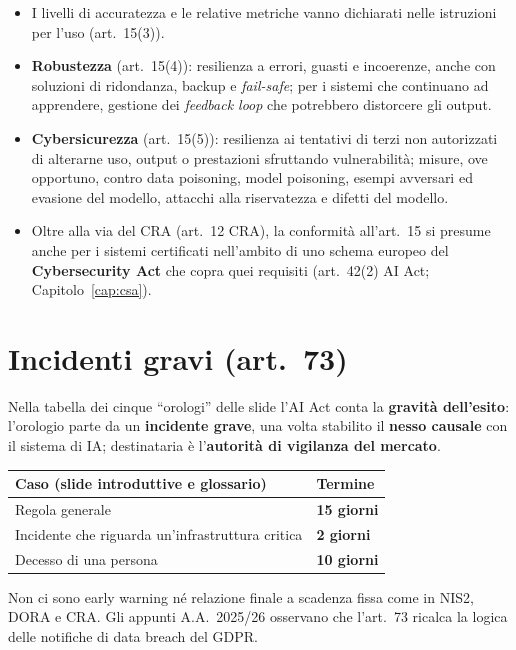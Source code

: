 \begin{integrazione}
\begin{itemize}
  \item I livelli di accuratezza e le relative metriche vanno dichiarati nelle istruzioni per l'uso
    (art.~15(3)).
  \item \textbf{Robustezza} (art.~15(4)): resilienza a errori, guasti e incoerenze, anche con soluzioni
    di ridondanza, backup e \emph{fail-safe}; per i sistemi che continuano ad apprendere, gestione dei
    \emph{feedback loop} che potrebbero distorcere gli output.
  \item \textbf{Cybersicurezza} (art.~15(5)): resilienza ai tentativi di terzi non autorizzati di
    alterarne uso, output o prestazioni sfruttando vulnerabilità; misure, ove opportuno, contro data
    poisoning, model poisoning, esempi avversari ed evasione del modello, attacchi alla riservatezza e
    difetti del modello.
  \item Oltre alla via del CRA (art.~12 CRA), la conformità all'art.~15 si presume anche per i sistemi
    certificati nell'ambito di uno schema europeo del \textbf{Cybersecurity Act} che copra quei
    requisiti (art.~42(2) AI Act; Capitolo~\ref{cap:csa}).
\end{itemize}
\end{integrazione}

\section{Incidenti gravi (art.~73)}
\label{sec:aiact-art73}

Nella tabella dei cinque ``orologi'' delle slide l'AI Act conta la \textbf{gravità dell'esito}: l'orologio
parte da un \textbf{incidente grave}, una volta stabilito il \textbf{nesso causale} con il sistema di IA;
destinataria è l'\textbf{autorità di vigilanza del mercato}.

\begin{center}
\small
\begin{tabularx}{\linewidth}{X >{\raggedright\arraybackslash}p{4.2cm}}
\toprule
\textbf{Caso (slide introduttive e glossario)} & \textbf{Termine} \\ \midrule
Regola generale & \textbf{15 giorni} \\
Incidente che riguarda un'infrastruttura critica & \textbf{2 giorni} \\
Decesso di una persona & \textbf{10 giorni} \\
\bottomrule
\end{tabularx}
\end{center}
\noindent Non ci sono early warning né relazione finale a scadenza fissa come in NIS2, DORA e CRA. Gli
appunti A.A.~2025/26 osservano che l'art.~73 ricalca la logica delle notifiche di data breach del GDPR.

